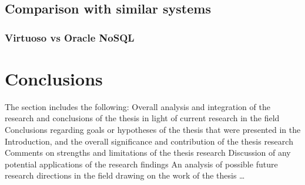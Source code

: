 \section{Comparison with similar systems}
\subsection{Virtuoso vs Oracle NoSQL}

\chapter{Conclusions}
The section includes the following:
 Overall analysis and integration of the research and conclusions of the thesis in light of current research in the field
 Conclusions regarding goals or hypotheses of the thesis that were presented in the Introduction, and the overall significance and contribution of the thesis research
 Comments on strengths and limitations of the thesis research
 Discussion of any potential applications of the research findings
 An analysis of possible future research directions in the field drawing on the work of the thesis
\ldots